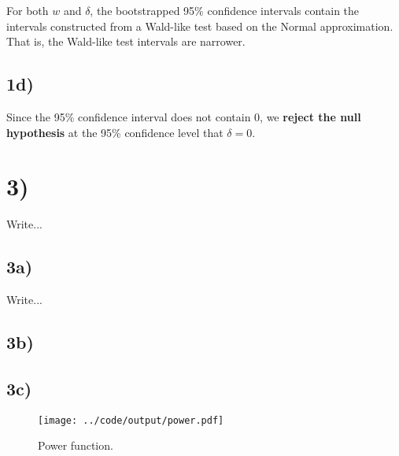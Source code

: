 \documentclass[11pt]{article}
\def\beginmyfig{\begin{figure}[H]\center} %
\def\endmyfig{\end{figure}}
\begin{document}
\noindent
For both $w$ and $\delta$, the bootstrapped 95\% confidence intervals contain
the intervals constructed from a Wald-like test based on the Normal
approximation. That is, the Wald-like test intervals are narrower.

\subsection*{1d)}
Since the 95\% confidence interval does not contain 0, we \textbf{reject the
null hypothesis} at the 95\% confidence level that $\delta=0$.


\section*{3)}
Write...
\subsection*{3a)}
Write...
\subsection*{3b)}
\subsection*{3c)}
\beginmyfig
  \texttt{[image: ../code/output/power.pdf]}
  \caption{\small Power function.}
  \label{fig:grid}
\endmyfig
\end{document}
